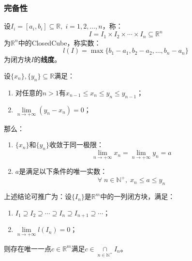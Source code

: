 \subsubsection{完备性}
\begin{definition}
	设$I_i=[a_i,b_i]\subseteq\mathbb{R},\;i=1,2,\dots,n$，称：
	\begin{equation*}
		I=I_1\times I_2\times\cdots\times I_n\subseteq\mathbb{R}^{n}
	\end{equation*}
	为$\mathbb{R}^{n}$中的\gls{ClosedCube}，称实数：
	\begin{equation*}
		l(I)=\max\{b_1-a_1,b_2-a_2,\dots,b_n-a_n\}
	\end{equation*}
	为闭方块$I$的\textbf{线度}。
\end{definition}
\begin{theorem}\label{theo:ClosedCubeTheorem}
	设$\{x_n\},\{y_n\}\subseteq\mathbb{R}$满足：
	\begin{enumerate}
		\item 对任意的$n>1$有$x_{n-1}\leqslant x_n\leqslant y_n\leqslant y_{n-1}$；
		\item $\lim\limits_{n\to+\infty}(y_n-x_n)=0$；
	\end{enumerate}
	那么：
	\begin{enumerate}
		\item $\{x_n\}$和$\{y_n\}$收敛于同一极限：
		\begin{equation*}
			\lim_{n\to+\infty}x_n=\lim_{n\to+\infty}y_n=a
		\end{equation*}
		\item $a$是满足以下条件的唯一实数：
		\begin{equation*}
			\forall\;n\in\mathbb{N}^+,\;x_n\leqslant a\leqslant y_n
		\end{equation*}
	\end{enumerate}
	上述结论可推广为：设$\{I_n\}$是$\mathbb{R}^{m}$中的一列闭方块，满足：
	\begin{enumerate}
		\item $I_1\supseteq I_2\supseteq\cdots\supseteq I_n\supseteq I_{n+1}\supseteq\cdots$；
		\item $\lim\limits_{n\to+\infty}l(I_n)=0$；
	\end{enumerate}
	则存在唯一一点$c\in\mathbb{R}^{m}$满足$c\in\underset{n\in\mathbb{N}^+}{\cap}I_n$。
\end{theorem}
